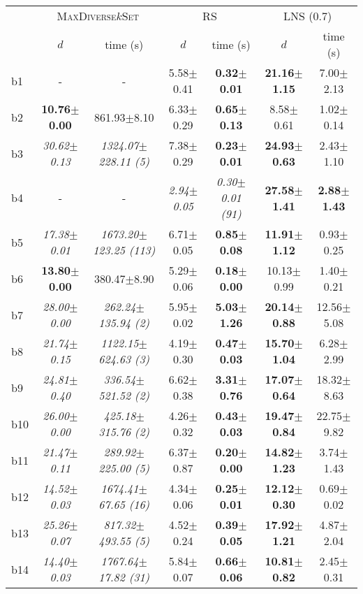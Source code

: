 \begin{longtable}{|l|c|c|c|c|c|c|}
\hline
&\multicolumn{2}{c|}{\textsc{MaxDiverse$k$Set}}&\multicolumn{2}{c|}{{RS}}&\multicolumn{2}{c|}{LNS (0.7)}\\
\cline{2-7}
&$d$&time (s)&$d$&time (s)&$d$&time (s)\\
\hline
b1&- & -&5.58$\pm$0.41 & \textbf{0.32$\pm$0.01}&\textbf{21.16$\pm$1.15} & 7.00$\pm$2.13
\\
b2&\textbf{10.76$\pm$0.00} & 861.93$\pm$8.10&6.33$\pm$0.29 & \textbf{0.65$\pm$0.13}&8.58$\pm$0.61 & 1.02$\pm$0.14
\\
b3&\textit{30.62$\pm$0.13} & \textit{1324.07$\pm$228.11 (5)}&7.38$\pm$0.29 & \textbf{0.23$\pm$0.01}&\textbf{24.93$\pm$0.63} & 2.43$\pm$1.10
\\
b4&- & -&\textit{2.94$\pm$0.05} & \textit{0.30$\pm$0.01 (91)}&\textbf{27.58$\pm$1.41} & \textbf{2.88$\pm$1.43}
\\
b5&\textit{17.38$\pm$0.01} & \textit{1673.20$\pm$123.25 (113)}&6.71$\pm$0.05 & \textbf{0.85$\pm$0.08}&\textbf{11.91$\pm$1.12} & 0.93$\pm$0.25
\\
b6&\textbf{13.80$\pm$0.00} & 380.47$\pm$8.90&5.29$\pm$0.06 & \textbf{0.18$\pm$0.00}&10.13$\pm$0.99 & 1.40$\pm$0.21
\\
b7&\textit{28.00$\pm$0.00} & \textit{262.24$\pm$135.94 (2)}&5.95$\pm$0.02 & \textbf{5.03$\pm$1.26}&\textbf{20.14$\pm$0.88} & 12.56$\pm$5.08
\\
b8&\textit{21.74$\pm$0.15} & \textit{1122.15$\pm$624.63 (3)}&4.19$\pm$0.30 & \textbf{0.47$\pm$0.03}&\textbf{15.70$\pm$1.04} & 6.28$\pm$2.99
\\
b9&\textit{24.81$\pm$0.40} & \textit{336.54$\pm$521.52 (2)}&6.62$\pm$0.38 & \textbf{3.31$\pm$0.76}&\textbf{17.07$\pm$0.64} & 18.32$\pm$8.63
\\
b10&\textit{26.00$\pm$0.00} & \textit{425.18$\pm$315.76 (2)}&4.26$\pm$0.32 & \textbf{0.43$\pm$0.03}&\textbf{19.47$\pm$0.84} & 22.75$\pm$9.82
\\
b11&\textit{21.47$\pm$0.11} & \textit{289.92$\pm$225.00 (5)}&6.37$\pm$0.87 & \textbf{0.20$\pm$0.00}&\textbf{14.82$\pm$1.23} & 3.74$\pm$1.43
\\
b12&\textit{14.52$\pm$0.03} & \textit{1674.41$\pm$67.65 (16)}&4.34$\pm$0.06 & \textbf{0.25$\pm$0.01}&\textbf{12.12$\pm$0.30} & 0.69$\pm$0.02
\\
b13&\textit{25.26$\pm$0.07} & \textit{817.32$\pm$493.55 (5)}&4.52$\pm$0.24 & \textbf{0.39$\pm$0.05}&\textbf{17.92$\pm$1.21} & 4.87$\pm$2.04
\\
b14&\textit{14.40$\pm$0.03} & \textit{1767.64$\pm$17.82 (31)}&5.84$\pm$0.07 & \textbf{0.66$\pm$0.06}&\textbf{10.81$\pm$0.82} & 2.45$\pm$0.31

\end{longtable}
